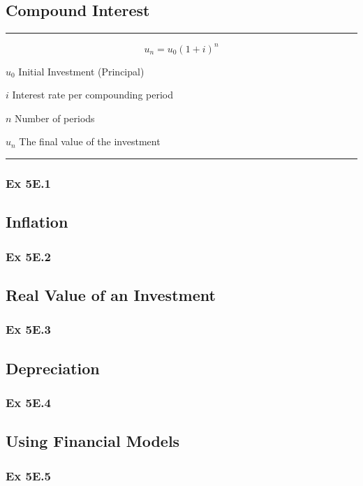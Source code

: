 \documentclass[12pt]{article}
\begin{document}
\subsection{Compound Interest}
\hrule\vspace{0.5cm}

\LARGE $$u_n = u_0(1+i)^n$$ \normalsize

\hspace{1cm}$u_0$ Initial Investment (Principal)

\hspace{1cm}$i$ Interest rate per compounding period

\hspace{1cm}$n$ Number of periods

\hspace{1cm}$u_n$ The final value of the investment

\vspace{0.5cm}\hrule
\subsubsection{Ex 5E.1}
\subsection{Inflation}
\subsubsection{Ex 5E.2}
\subsection{Real Value of an Investment}
\subsubsection{Ex 5E.3}
\subsection{Depreciation}
\subsubsection{Ex 5E.4}
\subsection{Using Financial Models}
\subsubsection{Ex 5E.5}
\end{document}
